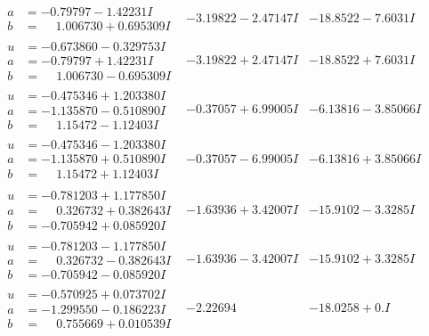 \documentclass[1p]{elsarticle_modified}
\theoremstyle{definition}
\begin{document}
$$\begin{array}{c|c|c}
\begin{aligned}
a &= -0.79797 - 1.42231 I \\
b &= \phantom{-}1.006730 + 0.695309 I\end{aligned}
 & -3.19822 - 2.47147 I & -18.8522 - 7.6031 I \\ \hline\begin{aligned}
u &= -0.673860 - 0.329753 I \\
a &= -0.79797 + 1.42231 I \\
b &= \phantom{-}1.006730 - 0.695309 I\end{aligned}
 & -3.19822 + 2.47147 I & -18.8522 + 7.6031 I \\ \hline\begin{aligned}
u &= -0.475346 + 1.203380 I \\
a &= -1.135870 - 0.510890 I \\
b &= \phantom{-}1.15472 - 1.12403 I\end{aligned}
 & -0.37057 + 6.99005 I & -6.13816 - 3.85066 I \\ \hline\begin{aligned}
u &= -0.475346 - 1.203380 I \\
a &= -1.135870 + 0.510890 I \\
b &= \phantom{-}1.15472 + 1.12403 I\end{aligned}
 & -0.37057 - 6.99005 I & -6.13816 + 3.85066 I \\ \hline\begin{aligned}
u &= -0.781203 + 1.177850 I \\
a &= \phantom{-}0.326732 + 0.382643 I \\
b &= -0.705942 + 0.085920 I\end{aligned}
 & -1.63936 + 3.42007 I & -15.9102 - 3.3285 I \\ \hline\begin{aligned}
u &= -0.781203 - 1.177850 I \\
a &= \phantom{-}0.326732 - 0.382643 I \\
b &= -0.705942 - 0.085920 I\end{aligned}
 & -1.63936 - 3.42007 I & -15.9102 + 3.3285 I \\ \hline\begin{aligned}
u &= -0.570925 + 0.073702 I \\
a &= -1.299550 - 0.186223 I \\
b &= \phantom{-}0.755669 + 0.010539 I\end{aligned}
 & -2.22694\phantom{ +0.000000I} & -18.0258 + 0. I\phantom{ +0.000000I} \\ \hline\begin{aligned}

\end{aligned}
\end{array}$$
\end{document}
